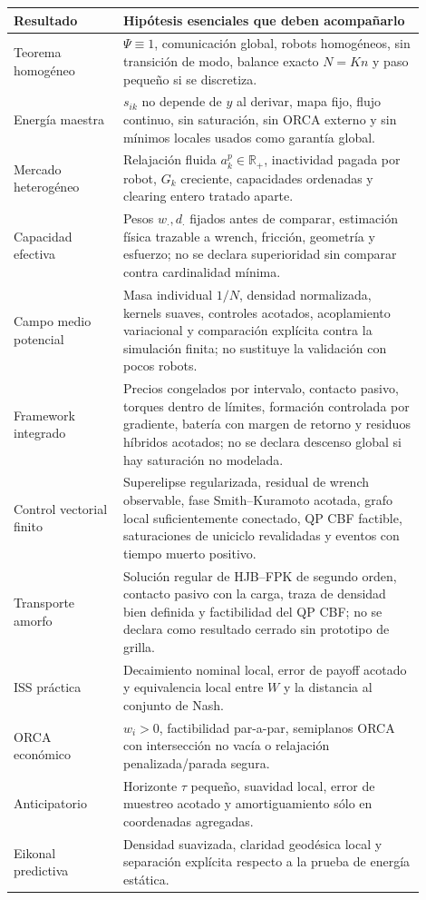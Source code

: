 \begingroup
\small
\setlength{\tabcolsep}{3pt}
\begin{longtable}{@{}p{0.24\linewidth}p{0.66\linewidth}@{}}
\toprule
\textbf{Resultado} & \textbf{Hipótesis esenciales que deben acompañarlo} \\
\midrule
Teorema homogéneo & $\Psi\equiv1$, comunicación global, robots homogéneos,
sin transición de modo, balance exacto $N=Kn$ y paso pequeño si se discretiza. \\
Energía maestra & $s_{ik}$ no depende de $y$ al derivar, mapa fijo, flujo continuo,
sin saturación, sin ORCA externo y sin mínimos locales usados como garantía global. \\
Mercado heterogéneo & Relajación fluida $a_k^p\in\mathbb{R}_+$, inactividad pagada por
robot, $G_k$ creciente, capacidades ordenadas y clearing entero tratado aparte. \\
Capacidad efectiva & Pesos $w_\cdot,d_\cdot$ fijados antes de comparar, estimación
física trazable a wrench, fricción, geometría y esfuerzo; no se declara superioridad sin
comparar contra cardinalidad mínima. \\
Campo medio potencial & Masa individual $1/N$, densidad normalizada, kernels suaves,
controles acotados, acoplamiento variacional y comparación explícita contra la simulación
finita; no sustituye la validación con pocos robots. \\
Framework integrado & Precios congelados por intervalo, contacto pasivo, torques dentro
de límites, formación controlada por gradiente, batería con margen de retorno y residuos
híbridos acotados; no se declara descenso global si hay saturación no modelada. \\
Control vectorial finito & Superelipse regularizada, residual de wrench observable,
fase Smith--Kuramoto acotada, grafo local suficientemente conectado, QP CBF factible,
saturaciones de uniciclo revalidadas y eventos con tiempo muerto positivo. \\
Transporte amorfo & Solución regular de HJB--FPK de segundo orden, contacto pasivo con
la carga, traza de densidad bien definida y factibilidad del QP CBF; no se declara como
resultado cerrado sin prototipo de grilla. \\
ISS práctica & Decaimiento nominal local, error de payoff acotado y equivalencia local
entre $W$ y la distancia al conjunto de Nash. \\
ORCA económico & $w_i>0$, factibilidad par-a-par, semiplanos ORCA con intersección
no vacía o relajación penalizada/parada segura. \\
Anticipatorio & Horizonte $\tau$ pequeño, suavidad local, error de muestreo acotado y
amortiguamiento sólo en coordenadas agregadas. \\
Eikonal predictiva & Densidad suavizada, claridad geodésica local y separación explícita
respecto a la prueba de energía estática. \\
\bottomrule
\end{longtable}
\endgroup

